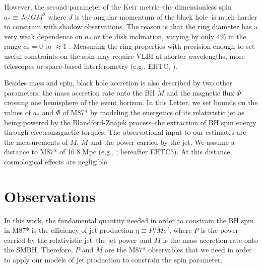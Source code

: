 \documentclass[twocolumn, linenumbers]{aastex62} %
\begin{document}
However, the second parameter of the Kerr metric--the dimensionless spin $a_* \equiv Jc/GM^2$ where $J$ is the angular momentum of the black hole--is much harder to constrain with shadow observations. The reason is that the ring diameter has a very weak dependence on $a_*$ or the disk inclination, varying by only 4\% in the range $a_*=0$ to $\approx 1$ \citep{Takahashi2004,Johannsen2010}. Measuring the ring properties with precision enough to set useful constraints on the spin may require VLBI at shorter wavelengths, more telescopes or space-based interferometry (e.g., EHTC, \citealt{Roelofs2019}).

Besides mass and spin, black hole accretion is also described by two other parameters: the mass accretion rate onto the BH $\dot{M}$ and the magnetic flux $\Phi$ crossing one hemisphere of the event horizon. In this Letter, we set bounds on the values of $a_*$ and $\Phi$ of M87* by modeling the energetics of its relativistic jet as being powered by the Blandford-Znajek process--the extraction of BH spin energy through electromagnetic torques. The observational input to our estimates are the measurements of $M$, $\dot{M}$ and the power carried by the jet. We assume a distance to M87* of 16.8 Mpc (e.g.,  \citealt{Blakeslee2009, EHTC2019e}; hereafter EHTC5). At this distance, cosmological effects are negligible. 




\section{Observations} \label{sec:obs}

In this work, the fundamental quantity needed in order to constrain the BH spin in M87* is the efficiency of jet production $\eta \equiv P/ \dot{M} c^2$, where $P$ is the power carried by the relativistic jet--the jet power--and $\dot{M}$ is the mass accretion rate onto the SMBH. Therefore, $P$ and $\dot{M}$ are the M87* observables that we need in order to apply our models of jet production to constrain the spin parameter.
\end{document}
